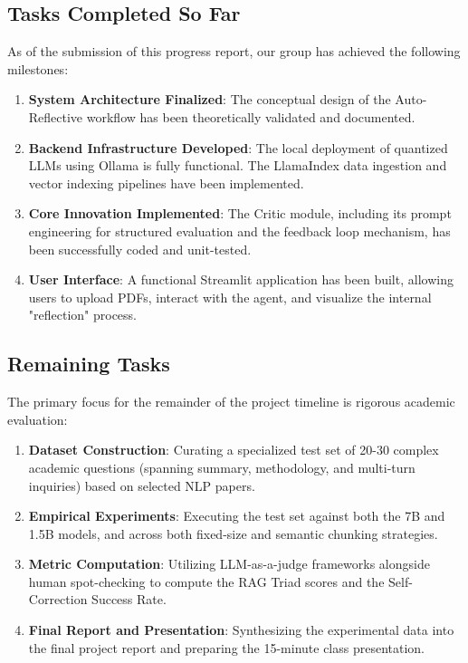 \documentclass[11pt,a4paper]{article}
\begin{document}
\subsection{Tasks Completed So Far}
As of the submission of this progress report, our group has achieved the following milestones:
\begin{enumerate}
    \item \textbf{System Architecture Finalized}: The conceptual design of the Auto-Reflective workflow has been theoretically validated and documented.
    \item \textbf{Backend Infrastructure Developed}: The local deployment of quantized LLMs using Ollama is fully functional. The LlamaIndex data ingestion and vector indexing pipelines have been implemented.
    \item \textbf{Core Innovation Implemented}: The Critic module, including its prompt engineering for structured evaluation and the feedback loop mechanism, has been successfully coded and unit-tested.
    \item \textbf{User Interface}: A functional Streamlit application has been built, allowing users to upload PDFs, interact with the agent, and visualize the internal "reflection" process.
\end{enumerate}

\subsection{Remaining Tasks}
The primary focus for the remainder of the project timeline is rigorous academic evaluation:
\begin{enumerate}
    \item \textbf{Dataset Construction}: Curating a specialized test set of 20-30 complex academic questions (spanning summary, methodology, and multi-turn inquiries) based on selected NLP papers.
    \item \textbf{Empirical Experiments}: Executing the test set against both the 7B and 1.5B models, and across both fixed-size and semantic chunking strategies.
    \item \textbf{Metric Computation}: Utilizing LLM-as-a-judge frameworks alongside human spot-checking to compute the RAG Triad scores and the Self-Correction Success Rate.
    \item \textbf{Final Report and Presentation}: Synthesizing the experimental data into the final project report and preparing the 15-minute class presentation.
\end{enumerate}
\end{document}
